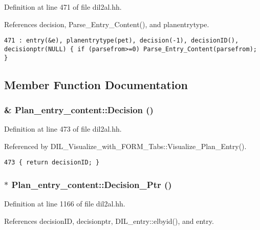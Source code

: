 Definition at line 471 of file dil2al.hh.

References decision, Parse\_\-Entry\_\-Content(), and planentrytype.



\footnotesize\begin{verbatim}471 : entry(&e), planentrytype(pet), decision(-1), decisionID(), decisionptr(NULL) { if (parsefrom>=0) Parse_Entry_Content(parsefrom); }
\end{verbatim}\normalsize 


\subsection{Member Function Documentation}
\subsubsection{\& Plan\_\-entry\_\-content::Decision ()\hspace{0.3cm}{\tt  [inline]}}\label{classPlan__entry__content_a2}




Definition at line 473 of file dil2al.hh.

Referenced by DIL\_\-Visualize\_\-with\_\-FORM\_\-Tabs::Visualize\_\-Plan\_\-Entry().



\footnotesize\begin{verbatim}473 { return decisionID; }
\end{verbatim}\normalsize 
{}
\subsubsection{ $\ast$ Plan\_\-entry\_\-content::Decision\_\-Ptr ()\hspace{0.3cm}{\tt  [inline]}}\label{classPlan__entry__content_a3}




Definition at line 1166 of file dil2al.hh.

References decision\-ID, decisionptr, DIL\_\-entry::elbyid(), and entry.



